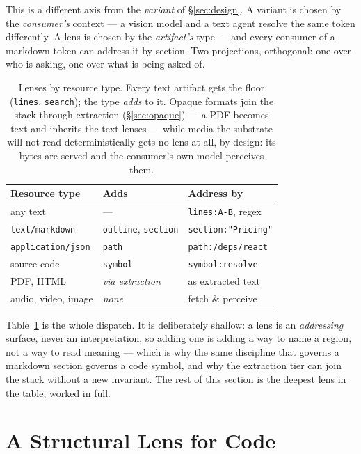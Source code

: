 \documentclass[10pt,twocolumn]{article}
\begin{document}
This is a different axis from the \emph{variant} of \S\ref{sec:design}. A variant is
chosen by the \emph{consumer's} context --- a vision model and a text agent resolve
the same token differently. A lens is chosen by the \emph{artifact's} type --- and
every consumer of a markdown token can address it by section. Two projections,
orthogonal: one over who is asking, one over what is being asked of.

\begin{table}[t]
\centering\small
\caption{Lenses by resource type. Every text artifact gets the floor
(\texttt{lines}, \texttt{search}); the type \emph{adds} to it. Opaque formats join
the stack through extraction (\S\ref{sec:opaque}) --- a PDF becomes text and inherits
the text lenses --- while media the substrate will not read deterministically gets no
lens at all, by design: its bytes are served and the consumer's own model perceives
them.}
\label{tab:lenses}
\renewcommand{\arraystretch}{1.2}
\begin{tabular}{@{}l l l@{}}
\toprule
\textbf{Resource type} & \textbf{Adds} & \textbf{Address by}\\
\midrule
any text & --- & \texttt{lines:A-B}, regex\\
\texttt{text/markdown} & \texttt{outline}, \texttt{section} & \texttt{section:"Pricing"}\\
\texttt{application/json} & \texttt{path} & \texttt{path:/deps/react}\\
source code & \texttt{symbol} & \texttt{symbol:resolve}\\
\midrule
PDF, HTML & \emph{via extraction} & as extracted text\\
audio, video, image & \emph{none} & fetch \& perceive\\
\bottomrule
\end{tabular}
\end{table}

Table~\ref{tab:lenses} is the whole dispatch. It is deliberately shallow: a lens is
an \emph{addressing} surface, never an interpretation, so adding one is adding a way
to name a region, not a way to read meaning --- which is why the same discipline that
governs a markdown section governs a code symbol, and why the extraction tier can
join the stack without a new invariant. The rest of this section is the deepest lens
in the table, worked in full.

\section{A Structural Lens for Code}
\label{sec:lens}
\end{document}
